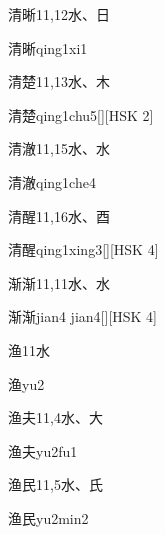 \begin{entry}{清晰}{11,12}{⽔、⽇}
  \begin{phonetics}{清晰}{qing1xi1}
  \end{phonetics}
\end{entry}

\begin{entry}{清楚}{11,13}{⽔、⽊}
  \begin{phonetics}{清楚}{qing1chu5}[][HSK 2]
  \end{phonetics}
\end{entry}

\begin{entry}{清澈}{11,15}{⽔、⽔}
  \begin{phonetics}{清澈}{qing1che4}
  \end{phonetics}
\end{entry}

\begin{entry}{清醒}{11,16}{⽔、⾣}
  \begin{phonetics}{清醒}{qing1xing3}[][HSK 4]
  \end{phonetics}
\end{entry}

\begin{entry}{渐渐}{11,11}{⽔、⽔}
  \begin{phonetics}{渐渐}{jian4 jian4}[][HSK 4]
  \end{phonetics}
\end{entry}

\begin{entry}{渔}{11}{⽔}
  \begin{phonetics}{渔}{yu2}
  \end{phonetics}
\end{entry}

\begin{entry}{渔夫}{11,4}{⽔、⼤}
  \begin{phonetics}{渔夫}{yu2fu1}
  \end{phonetics}
\end{entry}

\begin{entry}{渔民}{11,5}{⽔、⽒}
  \begin{phonetics}{渔民}{yu2min2}
  \end{phonetics}
\end{entry}

